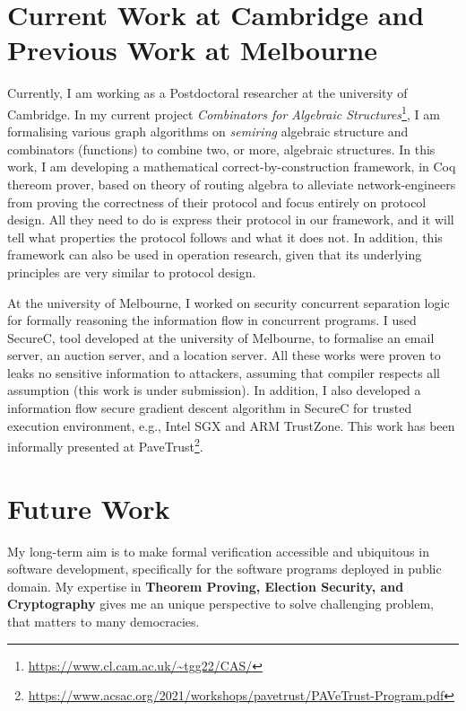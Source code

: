 \documentclass[a4paper]{article}
\begin{document}
\section{Current Work at Cambridge and Previous Work at Melbourne}
Currently, I am working as a Postdoctoral researcher at the university of Cambridge. 
In my current project \emph{Combinators for Algebraic Structures}\footnote{\url{https://www.cl.cam.ac.uk/~tgg22/CAS/}}, 
I am formalising various graph algorithms on \emph{semiring} algebraic 
structure and combinators (functions) to 
combine two, or more, algebraic structures. In this work, I am developing 
a mathematical correct-by-construction \cite{10.1007/978-3-319-66107-0_26} 
framework, in Coq thereom prover, based on theory of routing algebra 
\cite{10.1093/imamat/15.2.161, 10.1145/1080091.1080094} to alleviate network-engineers from 
proving the correctness of their protocol and focus entirely on protocol design.
All they need to do is express their protocol in our
framework, and it will tell what properties the protocol follows and what it does not. 
In addition, this framework can also be used in operation
research, given that its underlying principles are very similar to protocol design.



At the university of Melbourne, I worked on 
security concurrent separation logic for formally reasoning the information flow in concurrent programs. 
I used SecureC, tool developed at the university of Melbourne, to formalise an email server, 
an auction server, and a location server. All these works were proven to leaks no sensitive 
information to attackers, assuming that compiler respects all assumption (this work is under submission). 
In addition, I also developed a information flow secure gradient descent algorithm in SecureC for 
trusted execution environment, e.g., Intel SGX and ARM TrustZone. This work has been 
informally presented at PaveTrust\footnote{\url{https://www.acsac.org/2021/workshops/pavetrust/PAVeTrust-Program.pdf}}.


\section{Future Work}
My long-term aim is to make formal verification accessible and ubiquitous in 
software development, specifically for the software programs deployed in public domain. 
My expertise in \textbf{Theorem Proving, Election Security, and Cryptography}
gives me an unique perspective to solve challenging problem, that matters to many democracies. 
\end{document}
